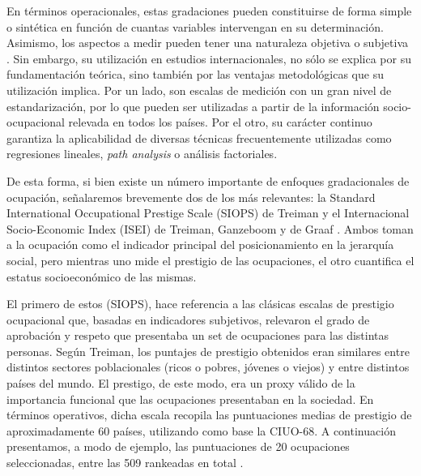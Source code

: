 \documentclass[
]{book}
\begin{document}
En términos operacionales, estas gradaciones pueden constituirse de forma simple o sintética en función de cuantas variables intervengan en su determinación. Asimismo, los aspectos a medir pueden tener una naturaleza objetiva o subjetiva \citep{CachonRodriguez1989}. Sin embargo, su utilización en estudios internacionales, no sólo se explica por su fundamentación teórica, sino también por las ventajas metodológicas que su utilización implica. Por un lado, son escalas de medición con un gran nivel de estandarización, por lo que pueden ser utilizadas a partir de la información socio-ocupacional relevada en todos los países. Por el otro, su carácter continuo garantiza la aplicabilidad de diversas técnicas frecuentemente utilizadas como regresiones lineales, \emph{path analysis} o análisis factoriales.

De esta forma, si bien existe un número importante de enfoques gradacionales de ocupación, señalaremos brevemente dos de los más relevantes: la Standard International Occupational Prestige Scale (SIOPS) de Treiman y el Internacional Socio-Economic Index (ISEI) de Treiman, Ganzeboom y de Graaf \citep{Bergman.Joye2001, FrancesGarcia2009}. Ambos toman a la ocupación como el indicador principal del posicionamiento en la jerarquía social, pero mientras uno mide el prestigio de las ocupaciones, el otro cuantifica el estatus socioeconómico de las mismas.

El primero de estos (SIOPS), hace referencia a las clásicas escalas de prestigio ocupacional que, basadas en indicadores subjetivos, relevaron el grado de aprobación y respeto que presentaba un set de ocupaciones para las distintas personas. Según Treiman, los puntajes de prestigio obtenidos eran similares entre distintos sectores poblacionales (ricos o pobres, jóvenes o viejos) y entre distintos países del mundo. El prestigo, de este modo, era un proxy válido de la importancia funcional que las ocupaciones presentaban en la sociedad. En términos operativos, dicha escala recopila las puntuaciones medias de prestigio de aproximadamente 60 países, utilizando como base la CIUO-68. A continuación presentamos, a modo de ejemplo, las puntuaciones de 20 ocupaciones seleccionadas, entre las 509 rankeadas en total \citep{Treiman2013}.
\end{document}
